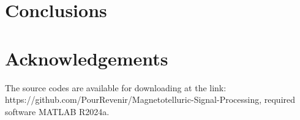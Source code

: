 \documentclass[9pt,a4paper,twoside]{rho-class/rho}
\begin{document}
\section{Conclusions}

\section{Acknowledgements}

\begin{rhoenv}[frametitle=Code availability]
    The source codes are available for downloading at the link: https://github.com/PourRevenir/Magnetotelluric-Signal-Processing, required software MATLAB R2024a.
\end{rhoenv}

    
        

            
\end{document}
